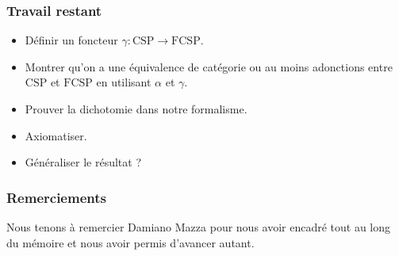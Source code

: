 \documentclass[12pt]{beamer}
\newcommand\csp{\text{CSP}}
\newcommand{\fcsp}{\text{FCSP}}
\begin{document}
\begin{frame}
    \frametitle{Travail restant}

    \begin{itemize}[<+->]
        \item Définir un foncteur $\gamma:\csp\rightarrow\fcsp$.
        \item Montrer qu'on a une équivalence de catégorie ou au moins adonctions
            entre $\csp$ et $\fcsp$ en utilisant $\alpha$ et $\gamma$.
        \item Prouver la dichotomie dans notre formalisme.
        \item Axiomatiser.
        \item Généraliser le résultat ?
    \end{itemize}
\end{frame}

\begin{frame}
    \frametitle{Remerciements}

    Nous tenons à remercier Damiano Mazza pour nous avoir encadré tout au long du
    mémoire et nous avoir permis d'avancer autant.
\end{frame}
\end{document}
